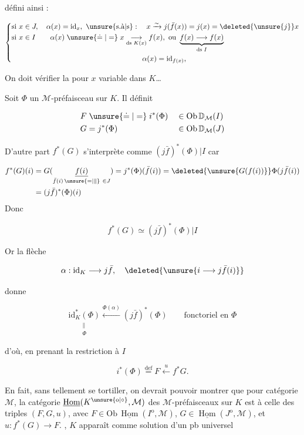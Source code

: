 défini ainsi :

\[
\left\{\begin{aligned}
&\text{si }x\in J,\quad\alpha(x)=\mathrm{id}_x,\ \text{\unsure{s.à|s}}:\quad
 x\xrightarrow{\sim}j(\bar f(x))=j(x)=\deleted{\unsure{j}}x\\
&\text{si }x\in I\qquad\alpha(x)\mathrel{\unsure{\doteq|=}} x\underset{\text{ds }K(x)}{\longrightarrow}f(x),\ \text{ou }
 \underbrace{f(x)\longrightarrow f(x)}_{\text{ds }I}\\
&\hspace{18em}\alpha(x)=\mathrm{id}_{f(x)},
\end{aligned}\right.
\]

On doit vérifier la  pour $x$ variable dans $K$\ldots

Soit $\Phi$ un $\mathcal M$-préfaisceau sur $K$. Il définit

\[
\begin{aligned}
F&\mathrel{\unsure{\doteq|=}}i^*(\Phi)&&\in\mathrm{Ob}\,\mathbb D_{\mathcal M}(I)\\
G&=j^*(\Phi)&&\in\mathrm{Ob}\,\mathbb D_{\mathcal M}(J)
\end{aligned}
\]

D'autre part $f^*(G)$ s'interprète comme $(j\bar f)^*(\Phi)|I$ car

\[
\begin{aligned}
f^*(G)(i)&=G(\underset{\bar f(i)\,\unsure{=|\parallel}\ \in J}{\underline{f(i)}})
 =j^*(\Phi)(\bar f(i))=\deleted{\unsure{G(f(i))}}\Phi(j\bar f(i))\\
&=(j\bar f)^*(\Phi)(i)
\end{aligned}
\]
Donc

\[
f^*(G)\simeq(j\bar f)^*(\Phi)|I
\]

Or la flèche

\[
\alpha:\mathrm{id}_K\longrightarrow j\bar f,\quad
\deleted{\unsure{i\longrightarrow j\bar f(i)}}
\]

donne

\[
\underset{\substack{\parallel\\\Phi}}{\mathrm{id}_K^*(\Phi)}
\xleftarrow{\Phi(\alpha)}(j\bar f)^*(\Phi)
\qquad\text{fonctoriel en }\Phi
\]

d'où, en prenant la restriction à $I$

\[
i^*(\Phi)\overset{\mathrm{def}}{=}F\xleftarrow{u}f^*G.
\]

En fait, sans tellement se tortiller, on devrait pouvoir montrer que  pour  catégorie $\mathcal M$, la catégorie $\underline{\operatorname{Hom}}(K^{\unsure{\mathrm o|\circ}},\mathcal M)$ des $\mathcal M$-préfaisceaux sur $K$ est  à celle des triples $(F,G,u)$, avec $F\in\mathrm{Ob}\,\underline{\operatorname{Hom}}(I^{\mathrm o},\mathcal M)$, $G\in\underline{\operatorname{Hom}}(J^{\mathrm o},\mathcal M)$, et $u:f^*(G)\longrightarrow F$.  , $K$ apparaît comme solution d'un pb  universel

